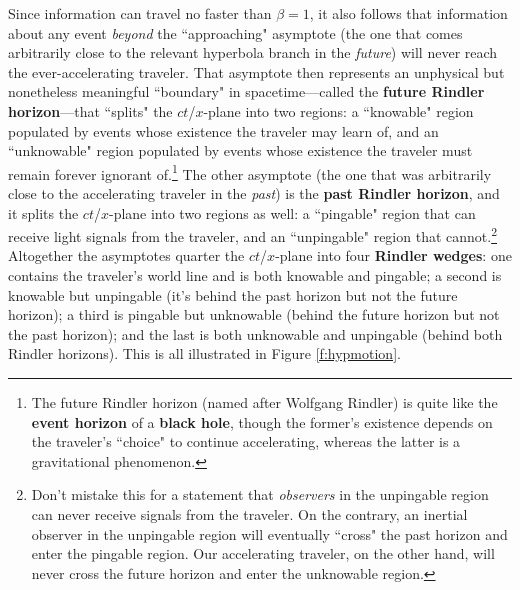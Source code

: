 \documentclass[12pt]{article}
\begin{document}
Since information can travel no faster than $\beta = 1$, it also follows that information about any event \emph{beyond} the ``approaching" asymptote (the one that comes arbitrarily close to the relevant hyperbola branch in the \emph{future}) will never reach the ever-accelerating traveler. That asymptote then represents an unphysical but nonetheless meaningful ``boundary" in spacetime---called the \textbf{future Rindler horizon}---that ``splits" the $ct$/$x$-plane into two regions: a ``knowable" region populated by events whose existence the traveler may learn of, and an ``unknowable" region populated by events whose existence the traveler must remain forever ignorant of.\footnote{The future Rindler horizon (named after Wolfgang Rindler) is quite like the \textbf{event horizon} of a \textbf{black hole}, though the former's existence depends on the traveler's ``choice" to continue accelerating, whereas the latter is a gravitational phenomenon.} The other asymptote (the one that was arbitrarily close to the accelerating traveler in the \emph{past}) is the \textbf{past Rindler horizon}, and it splits the $ct$/$x$-plane into two regions as well: a ``pingable" region that can receive light signals from the traveler, and an ``unpingable" region that cannot.\footnote{Don't mistake this for a statement that \emph{observers} in the unpingable region can never receive signals from the traveler. On the contrary, an inertial observer in the unpingable region will eventually ``cross" the past horizon and enter the pingable region. Our accelerating traveler, on the other hand, will never cross the future horizon and enter the unknowable region.} Altogether the asymptotes quarter the $ct$/$x$-plane into four \textbf{Rindler wedges}: one contains the traveler's world line and is both knowable and pingable; a second is knowable but unpingable (it's behind the past horizon but not the future horizon); a third is pingable but unknowable (behind the future horizon but not the past horizon); and the last is both unknowable and unpingable (behind both Rindler horizons). This is all illustrated in Figure \ref{f:hypmotion}.
\end{document}
